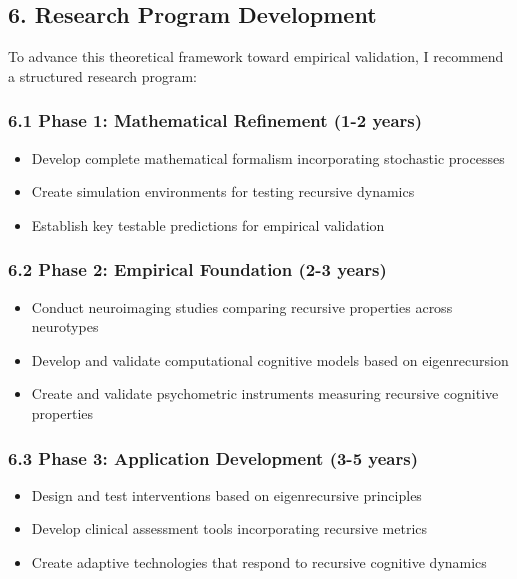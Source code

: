 \documentclass[
]{article}
\providecommand{\tightlist}{%
  \setlength{\itemsep}{0pt}\setlength{\parskip}{0pt}}
\begin{document}
\subsection{6. Research Program
Development}\label{research-program-development}

To advance this theoretical framework toward empirical validation, I
recommend a structured research program:

\subsubsection{6.1 Phase 1: Mathematical Refinement (1-2
years)}\label{phase-1-mathematical-refinement-1-2-years}

\begin{itemize}
\tightlist
\item
  Develop complete mathematical formalism incorporating stochastic
  processes
\item
  Create simulation environments for testing recursive dynamics
\item
  Establish key testable predictions for empirical validation
\end{itemize}

\subsubsection{6.2 Phase 2: Empirical Foundation (2-3
years)}\label{phase-2-empirical-foundation-2-3-years}

\begin{itemize}
\tightlist
\item
  Conduct neuroimaging studies comparing recursive properties across
  neurotypes
\item
  Develop and validate computational cognitive models based on
  eigenrecursion
\item
  Create and validate psychometric instruments measuring recursive
  cognitive properties
\end{itemize}

\subsubsection{6.3 Phase 3: Application Development (3-5
years)}\label{phase-3-application-development-3-5-years}

\begin{itemize}
\tightlist
\item
  Design and test interventions based on eigenrecursive principles
\item
  Develop clinical assessment tools incorporating recursive metrics
\item
  Create adaptive technologies that respond to recursive cognitive
  dynamics
\end{itemize}
\end{document}
